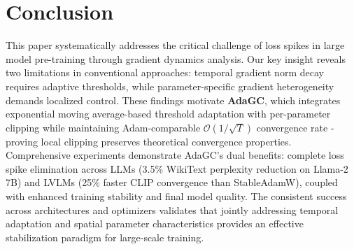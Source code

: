 \section{Conclusion}

This paper systematically addresses the critical challenge of loss spikes in large model pre-training through gradient dynamics analysis. Our key insight reveals two limitations in conventional approaches: temporal gradient norm decay requires adaptive thresholds, while parameter-specific gradient heterogeneity demands localized control. These findings motivate \textbf{AdaGC}, which integrates exponential moving average-based threshold adaptation with per-parameter clipping while maintaining Adam-comparable $\mathcal{O}(1/\sqrt{T})$ convergence rate - proving local clipping preserves theoretical convergence properties. Comprehensive experiments demonstrate AdaGC's dual benefits: complete loss spike elimination across LLMs (3.5\% WikiText perplexity reduction on Llama-2 7B) and LVLMs (25\% faster CLIP convergence than StableAdamW), coupled with enhanced training stability and final model quality. The consistent success across architectures and optimizers validates that jointly addressing temporal adaptation and spatial parameter characteristics provides an effective stabilization paradigm for large-scale training.

